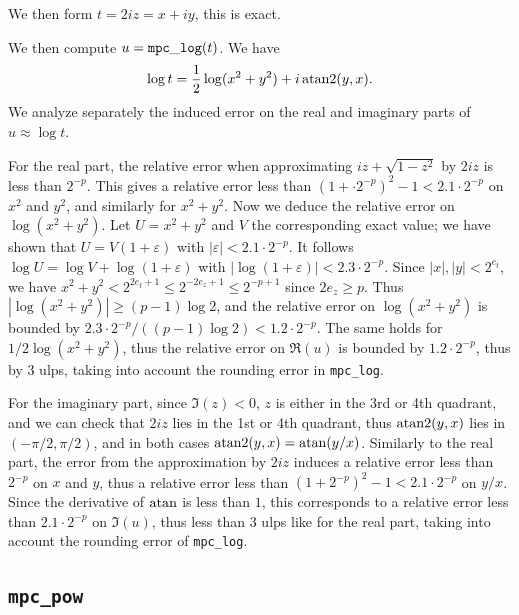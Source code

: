 \documentclass [11pt]{article}
\begin{document}
We then form $t = 2iz = x + iy$, this is exact.

We then compute $u = {\tt mpc\_log}(t)$.
We have
\[ \log t = \frac{1}{2} \log(x^2+y^2) + i \, {\rm atan2}(y,x). \]
We analyze separately the induced error on the real and imaginary parts
of $u \approx \log t$.

For the real part, the relative error when approximating
$iz + \sqrt{1-z^2}$ by $2iz$ is less than $2^{-p}$.
This gives a relative error less than $(1 + \cdot 2^{-p})^2 - 1 < 2.1 \cdot 2^{-p}$
on $x^2$ and $y^2$, and similarly for $x^2+y^2$.
Now we deduce the relative error on $\log(x^2+y^2)$.
Let $U = x^2+y^2$ and $V$ the corresponding exact value;
we have shown that $U = V (1 + \varepsilon)$ with
$|\varepsilon| < 2.1 \cdot 2^{-p}$.
It follows $\log U = \log V + \log(1 + \varepsilon)$
with $|\log(1 + \varepsilon)| < 2.3 \cdot 2^{-p}$.
Since $|x|, |y| < 2^{e_t}$, we have $x^2+y^2 < 2^{2e_t+1} \le 2^{-2e_z+1}
\le 2^{-p+1}$ since $2e_z \ge p$.
Thus $|\log(x^2+y^2)| \ge (p-1) \log 2$,
and the relative error on $\log(x^2+y^2)$ is bounded by
$2.3 \cdot 2^{-p}/((p-1) \log 2) < 1.2 \cdot 2^{-p}$.
The same holds for $1/2 \log(x^2+y^2)$, thus the relative error on $\Re(u)$
is bounded by $1.2 \cdot 2^{-p}$, thus by $3$ ulps, taking into account
the rounding error in \verb|mpc_log|.

For the imaginary part, since $\Im(z) < 0$, $z$ is either in the 3rd or 4th
quadrant, and we can check that $2iz$ lies in the 1st or 4th
quadrant, thus ${\rm atan2}(y,x)$ lies in $(-\pi/2,\pi/2)$, and in both
cases ${\rm atan2}(y,x) = {\rm atan}(y/x)$.
Similarly to the real part, the error from the approximation by $2iz$
induces a relative error less than $2^{-p}$ on $x$ and $y$,
thus a relative error less than $(1 + 2^{-p})^2-1 < 2.1 \cdot 2^{-p}$
on $y/x$.
Since the derivative of $\rm atan$ is less than $1$, this corresponds
to a relative error less than $2.1 \cdot 2^{-p}$ on $\Im(u)$,
thus less than $3$ ulps like for the real part,
taking into account the rounding error of \verb|mpc_log|.


\subsection {\texttt {mpc\_pow}}
\end{document}
